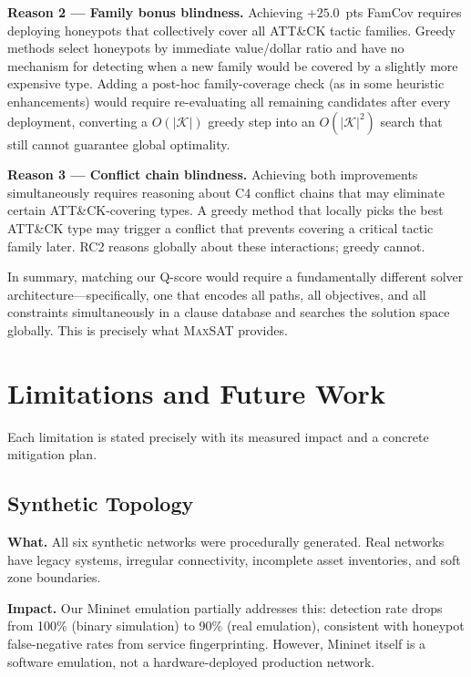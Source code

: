 \documentclass[journal]{IEEEtran}
\newcommand{\maxsat}{\textsc{MaxSAT}}
\newcommand{\calK}{\mathcal{K}}
\begin{document}
\textbf{Reason 2 --- Family bonus blindness.}
Achieving $+25.0$~pts FamCov requires deploying honeypots
that collectively cover all ATT\&CK tactic families.
Greedy methods select honeypots by immediate value/dollar
ratio and have no mechanism for detecting when a new
family would be covered by a slightly more expensive type.
Adding a post-hoc family-coverage check (as in some
heuristic enhancements) would require re-evaluating all
remaining candidates after every deployment, converting
a $O(|\calK|)$ greedy step into an $O(|\calK|^2)$ search
that still cannot guarantee global optimality.

\textbf{Reason 3 --- Conflict chain blindness.}
Achieving both improvements simultaneously requires
reasoning about C4 conflict chains that may eliminate
certain ATT\&CK-covering types.
A greedy method that locally picks the best ATT\&CK type
may trigger a conflict that prevents covering a critical
tactic family later.
RC2 reasons globally about these interactions; greedy
cannot.

In summary, matching our Q-score would require a
fundamentally different solver architecture---specifically,
one that encodes all paths, all objectives, and all
constraints simultaneously in a clause database and
searches the solution space globally.
This is precisely what \maxsat{} provides.

\FloatBarrier
\section{Limitations and Future Work}
\label{sec:discussion}

Each limitation is stated precisely with its measured
impact and a concrete mitigation plan.

\subsection{Synthetic Topology}

\textbf{What.}
All six synthetic networks were procedurally generated.
Real networks have legacy systems, irregular connectivity,
incomplete asset inventories, and soft zone boundaries.

\textbf{Impact.}
Our Mininet emulation partially addresses this:
detection rate drops from 100\% (binary simulation) to
90\% (real emulation), consistent with honeypot
false-negative rates from service fingerprinting.
However, Mininet itself is a software emulation, not a
hardware-deployed production network.
\end{document}
